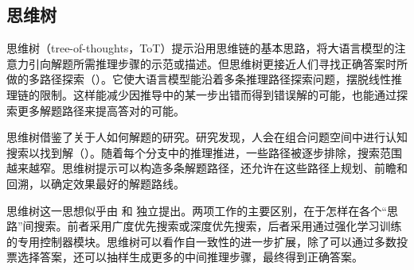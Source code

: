 \subsection{思维树}
思维树（tree-of-thoughts，ToT）提示沿用思维链的基本思路，将大语言模型的注意力引向解题所需推理步骤的示范或描述。但思维树更接近人们寻找正确答案时所做的多路径探索（）。它使大语言模型能沿着多条推理路径探索问题，摆脱线性推理链的限制。这样能减少因推导中的某一步出错而得到错误解的可能，也能通过探索更多解题路径来提高答对的可能。

\begin{keypoint}
思维树借鉴了关于人如何解题的研究。研究发现，人会在组合问题空间中进行认知搜索以找到解（）。随着每个分支中的推理推进，一些路径被逐步排除，搜索范围越来越窄。思维树提示可以构造多条解题路径，还允许在这些路径上规划、前瞻和回溯，以确定效果最好的解题路线。
\end{keypoint}

思维树这一思想似乎由 和 独立提出。两项工作的主要区别，在于怎样在各个“思路”间搜索。前者采用广度优先搜索或深度优先搜索，后者采用通过强化学习训练的专用控制器模块。思维树可以看作自一致性的进一步扩展，除了可以通过多数投票选择答案，还可以抽样生成更多的中间推理步骤，最终得到正确答案。
